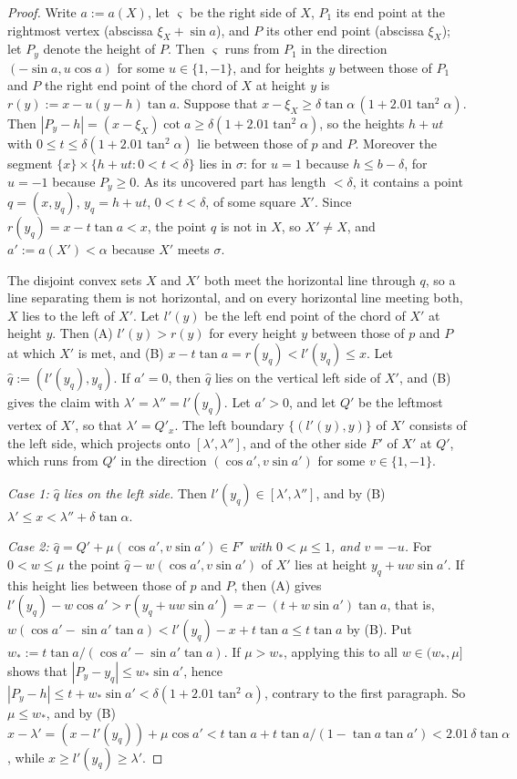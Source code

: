 \documentclass[11pt]{amsart}
\theoremstyle{definition}
\theoremstyle{remark}
\begin{document}
\begin{proof}
Write $a:=a(X)$, let $\varsigma$ be the right side of $X$, $P_1$ its end point at the rightmost vertex (abscissa $\xi_X+\sin a$), and $P$
its other end point (abscissa $\xi_X$); let $P_y$ denote the height of $P$. Then $\varsigma$ runs from $P_1$ in the direction $(-\sin a,u\cos a)$ for some $u\in\{1,-1\}$, and
for heights $y$ between those of $P_1$ and $P$ the right end point of the chord of $X$ at height $y$ is $r(y):=x-u(y-h)\tan a$.
Suppose that $x-\xi_X\ge\delta\tan\alpha\,(1+2.01\tan^2\alpha)$. Then $|P_y-h|=(x-\xi_X)\cot a\ge\delta(1+2.01\tan^2\alpha)$, so the
heights $h+ut$ with $0\le t\le\delta(1+2.01\tan^2\alpha)$ lie between those of $p$ and $P$. Moreover the segment
$\{x\}\times\{h+ut:0<t<\delta\}$ lies in $\sigma$: for $u=1$ because $h\le b-\delta$, for $u=-1$ because $P_y\ge0$. As its uncovered
part has length $<\delta$, it contains a point $q=(x,y_q)$, $y_q=h+ut$, $0<t<\delta$, of some square $X'$. Since
$r(y_q)=x-t\tan a<x$, the point $q$ is not in $X$, so $X'\ne X$, and $a':=a(X')<\alpha$ because $X'$ meets $\sigma$.

The disjoint convex sets $X$ and $X'$ both meet the horizontal line through $q$, so a line separating them is not horizontal, and
on every horizontal line meeting both, $X$ lies to the left of $X'$. Let $l'(y)$ be the left end point of the chord of $X'$ at
height $y$. Then (A) $l'(y)>r(y)$ for every height $y$ between those of $p$ and $P$ at which $X'$ is met, and (B)
$x-t\tan a=r(y_q)<l'(y_q)\le x$. Let $\hat q:=(l'(y_q),y_q)$. If $a'=0$, then $\hat q$ lies on the vertical left side of $X'$, and (B)
gives the claim with $\lambda'=\lambda''=l'(y_q)$. Let $a'>0$, and let $Q'$ be the leftmost vertex of $X'$, so that
$\lambda'=Q'_x$. The left boundary $\{(l'(y),y)\}$ of $X'$ consists of the left side, which projects onto $[\lambda',\lambda'']$,
and of the other side $F'$ of $X'$ at $Q'$, which runs from $Q'$ in the direction $(\cos a',v\sin a')$ for some $v\in\{1,-1\}$.

\emph{Case 1: $\hat q$ lies on the left side.} Then $l'(y_q)\in[\lambda',\lambda'']$, and by (B) $\lambda'\le x<\lambda''+\delta\tan\alpha$.

\emph{Case 2: $\hat q=Q'+\mu(\cos a',v\sin a')\in F'$ with $0<\mu\le1$, and $v=-u$.} For $0<w\le\mu$ the point
$\hat q-w(\cos a',v\sin a')$ of $X'$ lies at height $y_q+uw\sin a'$. If this height lies between those of $p$ and $P$, then (A)
gives $l'(y_q)-w\cos a'>r(y_q+uw\sin a')=x-(t+w\sin a')\tan a$, that is, $w(\cos a'-\sin a'\tan a)<l'(y_q)-x+t\tan a\le t\tan a$
by (B). Put $w_*:=t\tan a/(\cos a'-\sin a'\tan a)$. If $\mu>w_*$, applying this to all $w\in(w_*,\mu]$ shows that $|P_y-y_q|\le
w_*\sin a'$, hence $|P_y-h|\le t+w_*\sin a'<\delta(1+2.01\tan^2\alpha)$, contrary to the first paragraph. So $\mu\le w_*$, and by (B)
$x-\lambda'=(x-l'(y_q))+\mu\cos a'<t\tan a+t\tan a/(1-\tan a\tan a')<2.01\,\delta\tan\alpha$, while $x\ge l'(y_q)\ge\lambda'$.


\end{proof}
\end{document}
